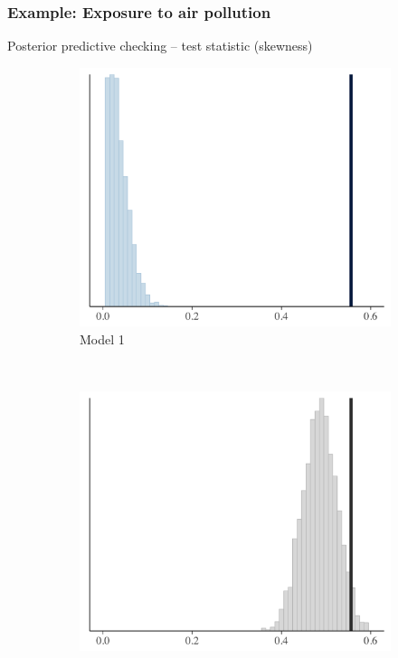 \documentclass[10pt,handout]{beamer}
\begin{document}
\begin{frame}

\frametitle{Example: Exposure to air pollution}


  Posterior predictive checking -- test statistic (skewness)
\begin{figure}
\centering
\begin{subfigure}{0.31\textwidth}
\includegraphics[width=\textwidth]{figs/ppc_skew1.png}
\caption{Model 1}
\end{subfigure}
~
\begin{subfigure}{0.31\textwidth}
\includegraphics[width=\textwidth]{figs/ppc_skew2.png}

\end{subfigure}
\end{figure}
\end{frame}
\end{document}
